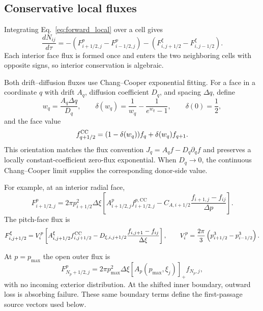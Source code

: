 \documentclass[11pt]{article}
\begin{document}
\subsection{Conservative local fluxes}

Integrating Eq.~\eqref{eq:forward_local} over a cell gives
\begin{equation}
 \frac{dN_{ij}}{d\tau}
 =-\left(F^p_{i+1/2,j}-F^p_{i-1/2,j}\right)
  -\left(F^\xi_{i,j+1/2}-F^\xi_{i,j-1/2}\right).
 \label{eq:fv_balance}
\end{equation}
Each interior face flux is formed once and enters the two neighboring cells with opposite
signs, so interior conservation is algebraic.

Both drift--diffusion fluxes use Chang--Cooper exponential fitting.  For a face in a
coordinate $q$ with drift $A_q$, diffusion coefficient $D_q$, and spacing $\Delta q$, define
\begin{equation}
 w_q=\frac{A_q\Delta q}{D_q},\qquad
 \delta(w_q)=\frac{1}{w_q}-\frac{1}{e^{w_q}-1},\qquad
 \delta(0)=\frac12,
 \label{eq:cc_weight}
\end{equation}
and the face value
\begin{equation}
 f^{\rm CC}_{q+1/2}
 =(1-\delta(w_q))f_q+\delta(w_q)f_{q+1}.
 \label{eq:cc_face_value}
\end{equation}
This orientation matches the flux convention $J_q=A_qf-D_q\partial_qf$ and preserves
a locally constant-coefficient zero-flux exponential.  When $D_q\to0$, the continuous
Chang--Cooper limit supplies the corresponding donor-side value.

For example, at an interior radial face,
\begin{equation}
 F^p_{i+1/2,j}
 =2\pi p_{i+1/2}^2\Delta\xi
 \left[
  A^p_{i+1/2,j}f^{p,\mathrm{CC}}_{i+1/2,j}
  -C_{A,i+1/2}\frac{f_{i+1,j}-f_{ij}}{\Delta p}
 \right].
 \label{eq:radial_flux}
\end{equation}
The pitch-face flux is
\begin{equation}
 F^\xi_{i,j+1/2}
 =V^p_i
  \left[
   A^\xi_{i,j+1/2}f^{\rm CC}_{i,j+1/2}
   -D_{\xi,i,j+1/2}\frac{f_{i,j+1}-f_{ij}}{\Delta\xi}
  \right],
 \qquad
 V^p_i=\frac{2\pi}{3}\left(p_{i+1/2}^3-p_{i-1/2}^3\right).
 \label{eq:pitch_flux}
\end{equation}

At $p=p_{\max}$ the open outer flux is
\begin{equation}
 F^p_{N_p+1/2,j}
 =2\pi p_{\max}^2\Delta\xi
  \left[A_p(p_{\max},\xi_j)\right]_+f_{N_p,j},
 \label{eq:outer_flux}
\end{equation}
with no incoming exterior distribution.  At the shifted inner boundary, outward loss is
absorbing failure.  These same boundary terms define the first-passage source vectors used
below.
\end{document}
